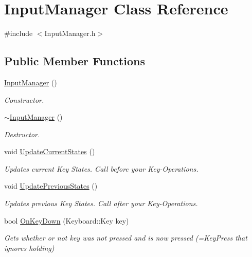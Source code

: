 \hypertarget{class_input_manager}{}\section{Input\+Manager Class Reference}
\label{class_input_manager}


{\ttfamily \#include $<$Input\+Manager.\+h$>$}

\subsection*{Public Member Functions}
\begin{DoxyCompactItemize}
\item 
\mbox{\hyperlink{class_input_manager_a8be46886da639b26d67181c29dab6d6c}{Input\+Manager}} ()
\begin{DoxyCompactList}\small\item\em Constructor. \end{DoxyCompactList}\item 
\mbox{\hyperlink{class_input_manager_af518290877dd183606709d5852db5491}{$\sim$\+Input\+Manager}} ()
\begin{DoxyCompactList}\small\item\em Destructor. \end{DoxyCompactList}\item 
void \mbox{\hyperlink{class_input_manager_a93883ab3c8f5bee33e66107515acc3e8}{Update\+Current\+States}} ()
\begin{DoxyCompactList}\small\item\em Updates current Key States. Call before you\textquotesingle{}r Key-\/\+Operations. \end{DoxyCompactList}\item 
void \mbox{\hyperlink{class_input_manager_ac965e4ef52a8a7753c106f2bcae64e21}{Update\+Previous\+States}} ()
\begin{DoxyCompactList}\small\item\em Updates previous Key States. Call after you\textquotesingle{}r Key-\/\+Operations. \end{DoxyCompactList}\item 
bool \mbox{\hyperlink{class_input_manager_a426512406d24de8dd5f0fb2241f6ea3c}{On\+Key\+Down}} (Keyboard\+::\+Key key)
\begin{DoxyCompactList}\small\item\em Gets whether or not key was not pressed and is now pressed (=Key\+Press that ignores holding) \end{DoxyCompactList}\end{DoxyCompactItemize}


